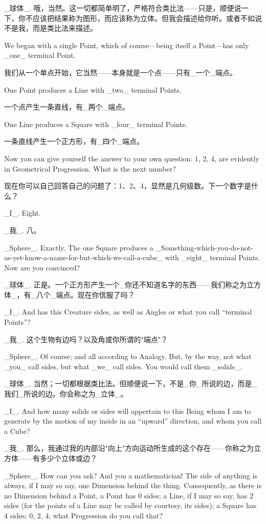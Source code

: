 \documentclass[12pt,UTF8]{ctexbook}
\begin{document}
\_球体\_. 哦，当然。这一切都简单明了，严格符合类比法——只是，顺便说一下，你不应该把结果称为图形，而应该称为立体。但我会描述给你听。或者不如说不是我，而是类比法来描述。

We began with a single Point, which of course---being itself a Point---has only \_one\_ terminal Point.

我们从一个单点开始，它当然——本身就是一个点——只有\_一个\_端点。

One Point produces a Line with \_two\_ terminal Points.

一个点产生一条直线，有\_两个\_端点。

One Line produces a Square with \_four\_ terminal Points.

一条直线产生一个正方形，有\_四个\_端点。

Now you can give yourself the answer to your own question: 1, 2, 4, are evidently in Geometrical Progression. What is the next number?

现在你可以自己回答自己的问题了：1、2、4，显然是几何级数。下一个数字是什么？

\_I\_. Eight.

\_我\_. 八。

\_Sphere\_. Exactly. The one Square produces a \_Something-which-you-do-not-as-yet-know-a-name-for-but-which-we-call-a-cube\_ with \_eight\_ terminal Points. Now are you convinced?

\_球体\_. 正是。一个正方形产生一个\_你还不知道名字的东西——我们称之为立方体\_，有\_八个\_端点。现在你信服了吗？

\_I\_. And has this Creature sides, as well as Angles or what you call ``terminal Points''?

\_我\_. 这个生物有边吗？以及角或你所谓的"端点"？

\_Sphere\_. Of course; and all according to Analogy. But, by the way, not what \_you\_ call sides, but what \_we\_ call sides. You would call them \_solids\_.

\_球体\_. 当然；一切都根据类比法。但顺便说一下，不是\_你\_所说的边，而是\_我们\_所说的边。你会称之为\_立体\_。

\_I\_. And how many solids or sides will appertain to this Being whom I am to generate by the motion of my inside in an ``upward'' direction, and whom you call a Cube?

\_我\_. 那么，我通过我的内部沿"向上"方向运动所生成的这个存在——你称之为立方体——有多少个立体或边？

\_Sphere\_. How can you ask? And you a mathematician! The side of anything is always, if I may so say, one Dimension behind the thing. Consequently, as there is no Dimension behind a Point, a Point has 0 sides; a Line, if I may so say, has 2 sides (for the points of a Line may be called by courtesy, its sides); a Square has 4 sides; 0, 2, 4; what Progression do you call that?
\end{document}
